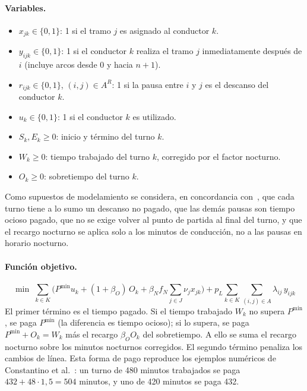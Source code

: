 \documentclass[letter, 10pt]{article}
\begin{document}
\paragraph{Variables.}
\begin{itemize}
\item $x_{jk}\in\{0,1\}$: 1 si el tramo $j$ es asignado al conductor $k$.
\item $y_{ijk}\in\{0,1\}$: 1 si el conductor $k$ realiza el tramo $j$ inmediatamente después de $i$ (incluye arcos desde $0$ y hacia $n{+}1$).
\item $r_{ijk}\in\{0,1\}$, $(i,j)\in A^R$: 1 si la pausa entre $i$ y $j$ es el descanso del conductor $k$.
\item $u_k\in\{0,1\}$: 1 si el conductor $k$ es utilizado.
\item $S_k, E_k\geq 0$: inicio y término del turno $k$.
\item $W_k\geq 0$: tiempo trabajado del turno $k$, corregido por el factor nocturno.
\item $O_k\geq 0$: sobretiempo del turno $k$.
\end{itemize}
Como supuestos de modelamiento se considera, en concordancia con~\cite{Constantino2017}, que cada turno tiene a lo sumo un descanso no pagado, que las demás pausas son tiempo ocioso pagado, que no se exige volver al punto de partida al final del turno, y que el recargo nocturno se aplica solo a los minutos de conducción, no a las pausas en horario nocturno.

\paragraph{Función objetivo.}
\begin{equation}
\min\; \sum_{k\in K}\Big( P^{\min}u_k + (1+\beta_O)\,O_k + \beta_N f_N \sum_{j\in J}\nu_j x_{jk}\Big) + p_L\sum_{k\in K}\sum_{(i,j)\in A}\lambda_{ij}\,y_{ijk}
\label{eq:fo}
\end{equation}
El primer término es el tiempo pagado. Si el tiempo trabajado $W_k$ no supera $P^{\min}$, se paga $P^{\min}$ (la diferencia es tiempo ocioso); si lo supera, se paga $P^{\min}+O_k=W_k$ más el recargo $\beta_O O_k$ del sobretiempo. A ello se suma el recargo nocturno sobre los minutos nocturnos corregidos. El segundo término penaliza los cambios de línea. Esta forma de pago reproduce los ejemplos numéricos de Constantino et al.~\cite{Constantino2017}: un turno de 480 minutos trabajados se paga $432+48\cdot 1{,}5=504$ minutos, y uno de 420 minutos se paga 432.
\end{document}
